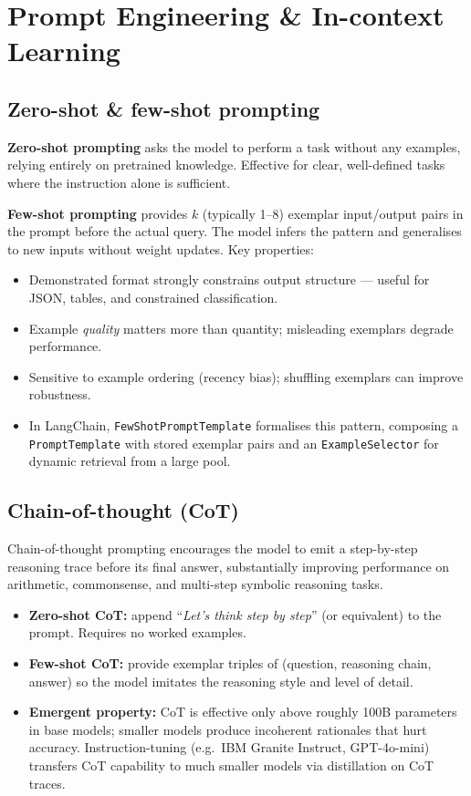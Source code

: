 
\section{Prompt Engineering \& In-context Learning}

\subsection{Zero-shot \& few-shot prompting}

\textbf{Zero-shot prompting} asks the model to perform a task without any examples,
relying entirely on pretrained knowledge. Effective for clear, well-defined tasks where
the instruction alone is sufficient.

\textbf{Few-shot prompting} provides $k$ (typically 1--8) exemplar input/output pairs
in the prompt before the actual query. The model infers the pattern and generalises to
new inputs without weight updates. Key properties:

\begin{itemize}
  \item Demonstrated format strongly constrains output structure — useful for JSON,
    tables, and constrained classification.
  \item Example \emph{quality} matters more than quantity; misleading exemplars degrade
    performance.
  \item Sensitive to example ordering (recency bias); shuffling exemplars can improve
    robustness.
  \item In LangChain, \texttt{FewShotPromptTemplate} formalises this pattern,
    composing a \texttt{PromptTemplate} with stored exemplar pairs and an
    \texttt{ExampleSelector} for dynamic retrieval from a large pool.
\end{itemize}

\subsection{Chain-of-thought (CoT)}

Chain-of-thought prompting encourages the model to emit a step-by-step reasoning trace
before its final answer, substantially improving performance on arithmetic, commonsense,
and multi-step symbolic reasoning tasks.

\begin{itemize}
  \item \textbf{Zero-shot CoT:} append ``\emph{Let's think step by step}'' (or
    equivalent) to the prompt. Requires no worked examples.
  \item \textbf{Few-shot CoT:} provide exemplar triples of (question, reasoning chain,
    answer) so the model imitates the reasoning style and level of detail.
  \item \textbf{Emergent property:} CoT is effective only above roughly 100B parameters
    in base models; smaller models produce incoherent rationales that hurt accuracy.
    Instruction-tuning (e.g.\ IBM Granite Instruct, GPT-4o-mini) transfers CoT
    capability to much smaller models via distillation on CoT traces.
\end{itemize}

